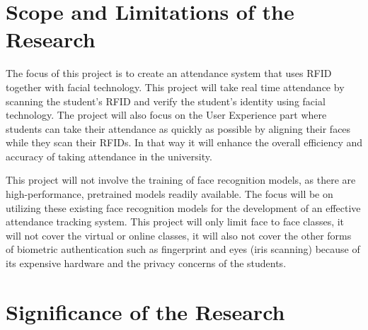 	\section{Scope and Limitations of the Research}
\label{sec:scopelimitations}

The focus of this project is to create an attendance system that uses RFID together with facial technology. This project will take real time attendance by scanning the student's RFID and verify the student's identity using facial technology. The project will also focus on the User Experience part where students can take their attendance as quickly as possible by aligning their faces while they scan their RFIDs. In that way it will enhance the overall efficiency and accuracy of taking attendance in the university.

This project will not involve the training of face recognition models, as there are high-performance, pretrained models readily available. The focus will be on utilizing these existing face recognition models for the development of an effective attendance tracking system. This project will only limit face to face classes, it will not cover the virtual or online classes, it will also not cover the other forms of biometric authentication such as fingerprint and eyes (iris scanning) because of its expensive hardware and the privacy concerns of the students.


\begin{comment}
	This section discusses the boundaries (with respect to the objectives) of the research and the constraints within 
	which the research will be developed.
\end{comment}

\begin{comment}

%
%
Generally, one paragraph should be allotted for each of your research objectives.

Each paragraph contains a brief overview of the concept/theory and the purpose of doing the associated objective.

Each paragraph also includes a description of the scope/limitation of your study.

* Please refer to the slides for examples.

\end{comment}


\section{Significance of the Research}
\label{sec:significance}

